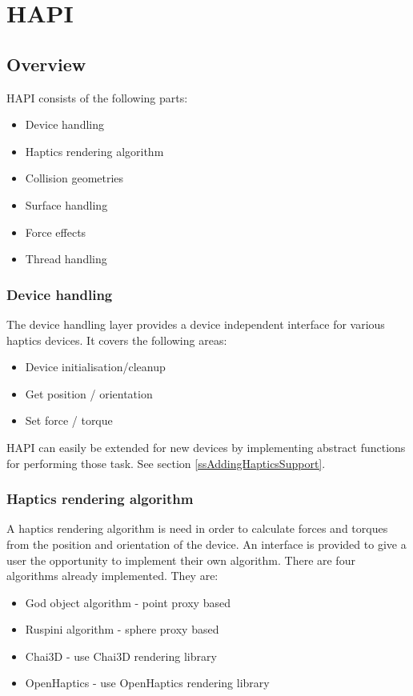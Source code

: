 
\chapter {HAPI}


\section{Overview}

HAPI consists of the following parts:

\begin{itemize}
\item Device handling
\item Haptics rendering algorithm
\item Collision geometries
\item Surface handling
\item Force effects
\item Thread handling
\end{itemize}


\subsection{Device handling}
The device handling layer provides a device independent
interface for various haptics devices. It covers the following
areas:

\begin{itemize}
\item Device initialisation/cleanup
\item Get position / orientation 
\item Set force / torque
\end{itemize}

HAPI can easily be extended for new devices by implementing abstract
functions for performing those task. See section \ref{ssAddingHapticsSupport}.

\subsection{Haptics rendering algorithm}
A haptics rendering algorithm is need in order to calculate forces and
torques from the position and orientation of the device. An interface
is provided to give a user the opportunity to implement their own
algorithm. There are four algorithms already implemented. They are:

\begin{itemize}
\item God object algorithm - point proxy based
\item Ruspini algorithm - sphere proxy based
\item Chai3D - use Chai3D rendering library
\item OpenHaptics - use OpenHaptics rendering library
\end{itemize}

